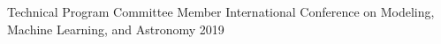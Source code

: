 


\begin{cvhonors}

    \cvhonor
        {Technical Program Committee Member}
        {International Conference on Modeling, Machine Learning, and Astronomy}
        {}
        {2019}

\end{cvhonors}